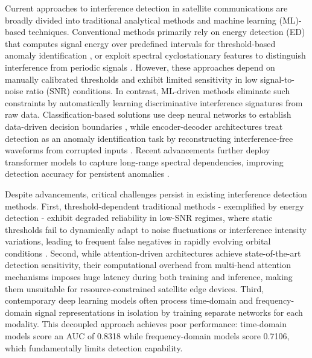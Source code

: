 \documentclass[conference]{IEEEtran}
\begin{document}
Current approaches to interference detection in satellite communications are broadly divided into traditional analytical methods and machine learning (ML)-based techniques. Conventional methods primarily rely on energy detection (ED) that computes signal energy over predefined intervals for threshold-based anomaly identification \cite{kay2009fundamentals}, or exploit spectral cyclostationary features to distinguish interference from periodic signals \cite{experimentalCyclostationary}. However, these approaches depend on manually calibrated thresholds and exhibit limited sensitivity in low signal-to-noise ratio (SNR) conditions. In contrast, ML-driven methods eliminate such constraints by automatically learning discriminative interference signatures from raw data. Classification-based solutions use deep neural networks to establish data-driven decision boundaries \cite{pellacoSpectrumPredictionInterference2019}, while encoder-decoder architectures treat detection as an anomaly identification task by reconstructing interference-free waveforms from corrupted inputs \cite{saifaldawlaConvolutionalAutoencodersNonGeostationary2024}. Recent advancements further deploy transformer models to capture long-range spectral dependencies, improving detection accuracy for persistent anomalies \cite{saifaldawlaGenAIBasedModelsNGSO2024}.


Despite advancements, critical challenges persist in existing interference detection methods. First, threshold-dependent traditional methods - exemplified by energy detection - exhibit degraded reliability in low-SNR regimes, where static thresholds fail to dynamically adapt to noise fluctuations or interference intensity variations, leading to frequent false negatives in rapidly evolving orbital conditions \cite{saifaldawlaGenAIBasedModelsNGSO2024}. Second, while attention-driven architectures achieve state-of-the-art detection sensitivity, their computational overhead from multi-head attention mechanisms imposes huge latency during both training and inference, making them unsuitable for resource-constrained satellite edge devices. Third, contemporary deep learning models often process time-domain and frequency-domain signal representations in isolation by training separate networks for each modality. This decoupled approach achieves poor performance: time-domain models score an AUC of 0.8318 while frequency-domain models score 0.7106, which fundamentally limits detection capability.
\end{document}
